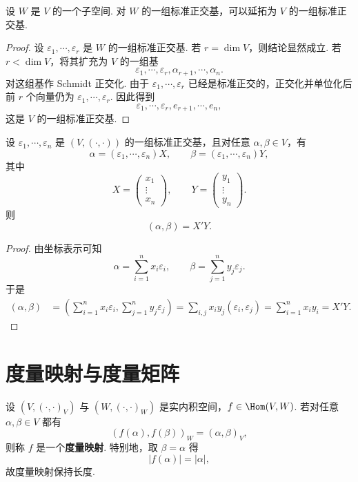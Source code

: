 \begin{corollary}
	设 $W$ 是 $V$ 的一个子空间. 对 $W$ 的一组标准正交基，可以延拓为 $V$ 的一组标准正交基.
\end{corollary}
\begin{proof}
	设 $\varepsilon_1,\cdots,\varepsilon_r$ 是 $W$ 的一组标准正交基. 若 $r=\dim V$，则结论显然成立. 若 $r<\dim V$，将其扩充为 $V$ 的一组基
	\[
	\varepsilon_1,\cdots,\varepsilon_r,\alpha_{r+1},\cdots,\alpha_n.
	\]
	对这组基作 Schmidt 正交化. 由于 $\varepsilon_1,\cdots,\varepsilon_r$ 已经是标准正交的，正交化并单位化后前 $r$ 个向量仍为 $\varepsilon_1,\cdots,\varepsilon_r$. 因此得到
	\[
	\varepsilon_1,\cdots,\varepsilon_r,e_{r+1},\cdots,e_n,
	\]
	这是 $V$ 的一组标准正交基.
\end{proof}

\begin{lemma}
	设 $\varepsilon_1,\cdots,\varepsilon_n$ 是 $(V,(\cdot,\cdot))$ 的一组标准正交基，且对任意 $\alpha,\beta\in V$，有
	\[
	\alpha=(\varepsilon_1,\cdots,\varepsilon_n)X,
	\qquad
	\beta=(\varepsilon_1,\cdots,\varepsilon_n)Y,
	\]
	其中
	\[
	X=\begin{pmatrix}
		x_1\\
		\vdots\\
		x_n
	\end{pmatrix},
	\qquad
	Y=\begin{pmatrix}
		y_1\\
		\vdots\\
		y_n
	\end{pmatrix}.
	\]
	则
	\[
	(\alpha,\beta)=X'Y.
	\]
\end{lemma}
\begin{proof}
	由坐标表示可知
	\[
	\alpha=\sum_{i=1}^{n}x_i\varepsilon_i,
	\qquad
	\beta=\sum_{j=1}^{n}y_j\varepsilon_j.
	\]
	于是
	\[
	\begin{aligned}
		(\alpha,\beta)
		&=\left(\sum_{i=1}^{n}x_i\varepsilon_i,
		\sum_{j=1}^{n}y_j\varepsilon_j\right)=\sum_{i,j}x_i y_j(\varepsilon_i,\varepsilon_j)=\sum_{i=1}^{n}x_i y_i=X'Y.
	\end{aligned}
	\]
\end{proof}

\section{度量映射与度量矩阵}



\begin{definition}
	设 $(V,(\cdot,\cdot)_V)$ 与 $(W,(\cdot,\cdot)_W)$ 是实内积空间，$f\in\Hom(V,W)$. 若对任意 $\alpha,\beta\in V$ 都有
	\[
	(f(\alpha),f(\beta))_W=(\alpha,\beta)_V,
	\]
	则称 $f$ 是一个\textbf{度量映射}. 特别地，取 $\beta=\alpha$ 得
	\[
	|f(\alpha)|=|\alpha|,
	\]
	故度量映射保持长度.
\end{definition}

